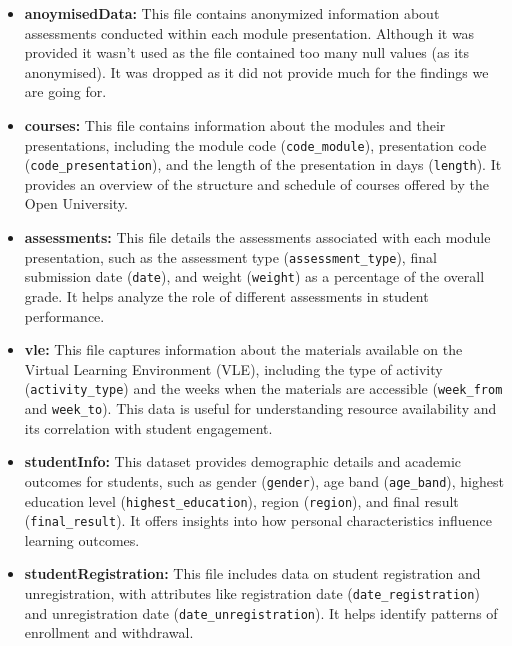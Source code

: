 \begin{itemize}
    \item \textbf{anoymisedData:} This file contains anonymized information about assessments conducted within each module presentation. Although it was provided it wasn't used as the file contained too many null values (as its anonymised). It was dropped as it did not provide much for the findings we are going for. 
    
    \item \textbf{courses:} This file contains information about the modules and their presentations, including the module code (\texttt{code\_module}), presentation code (\texttt{code\_presentation}), and the length of the presentation in days (\texttt{length}). It provides an overview of the structure and schedule of courses offered by the Open University.

    \item \textbf{assessments:} This file details the assessments associated with each module presentation, such as the assessment type (\texttt{assessment\_type}), final submission date (\texttt{date}), and weight (\texttt{weight}) as a percentage of the overall grade. It helps analyze the role of different assessments in student performance.

    \item \textbf{vle:} This file captures information about the materials available on the Virtual Learning Environment (VLE), including the type of activity (\texttt{activity\_type}) and the weeks when the materials are accessible (\texttt{week\_from} and \texttt{week\_to}). This data is useful for understanding resource availability and its correlation with student engagement.

    \item \textbf{studentInfo:} This dataset provides demographic details and academic outcomes for students, such as gender (\texttt{gender}), age band (\texttt{age\_band}), highest education level (\texttt{highest\_education}), region (\texttt{region}), and final result (\texttt{final\_result}). It offers insights into how personal characteristics influence learning outcomes.

    \item \textbf{studentRegistration:} This file includes data on student registration and unregistration, with attributes like registration date (\texttt{date\_registration}) and unregistration date (\texttt{date\_unregistration}). It helps identify patterns of enrollment and withdrawal.


\end{itemize}
